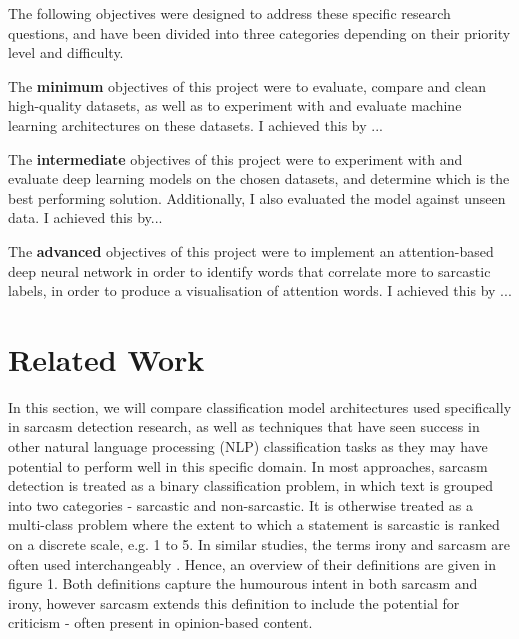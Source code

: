 \documentclass[12pt,a4paper]{article}
\begin{document}
\noindent The following objectives were designed to address these specific research questions, and have been divided into three categories depending on their priority level and difficulty.

The \textbf{minimum} objectives of this project were to evaluate, compare and clean high-quality datasets, as well as to experiment with and evaluate machine learning architectures on these datasets. I achieved this by ...

The \textbf{intermediate} objectives of this project were to experiment with and evaluate deep learning models on the chosen datasets, and determine which is the best performing solution. Additionally, I also evaluated the model against unseen data. I achieved this by...

The \textbf{advanced} objectives of this project were to implement an attention-based deep neural network in order to identify words that correlate more to sarcastic labels, in order to produce a visualisation of attention words. I achieved this by ...





\vfill

\section{Related Work}
\noindent In this section, we will compare classification model architectures used specifically in sarcasm detection research, as well as techniques that have seen success in other natural language processing (NLP) classification tasks as they may have potential to perform well in this specific domain. In most approaches, sarcasm detection is treated as a binary classification problem, in which text is grouped into two categories - sarcastic and non-sarcastic. It is otherwise treated as a multi-class problem where the extent to which a statement is sarcastic is ranked on a discrete scale, e.g. 1 to 5. 
In similar studies, the terms irony and sarcasm are often used interchangeably \cite{tsur2010icwsm}. Hence, an overview of their definitions are given in figure 1. Both definitions capture the humourous intent in both sarcasm and irony, however sarcasm extends this definition to include the potential for criticism - often present in opinion-based content.
\end{document}
